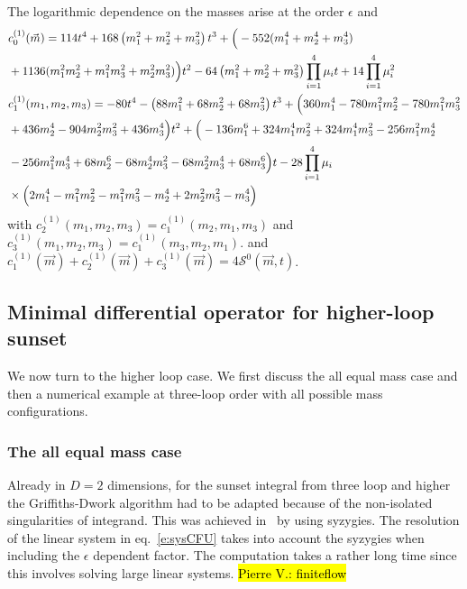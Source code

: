 \documentclass[a4paper,12pt]{article}
\numberwithin{equation}{section}
\numberwithin{figure}{section}
\newcommand{\pvnote}[1]{\sethlcolor{bubblegum} \protect\hl{Pierre V.: #1} \sethlcolor{yellow}}
\begin{document}
The logarithmic dependence on the masses arise at the order $\epsilon$ 
 and
 \begin{align}
&     c^{(1)}_0(\vec m)=114 t^{4}+168\left(m_{1}^{2}+ m_{2}^{2}+ m_{3}^{2}\right)
  t^{3}+\Big(-552 (m_{1}^{4}+m_2^4+m_3^4)\cr&+1136 (m_{1}^{2} m_{2}^{2}+
    m_{1}^{2} m_{3}^{2}+ m_{2}^{2} m_{3}^{2})\Big) t^{2}-64
  \left(m_{1}^{2}+m_{2}^{2}+m_{3}^{2}\right) \prod_{i=1}^4\mu_i t +14 \prod_{i=1}^4\mu_i^2\\
& c^{(1)}_1(m_1,m_2,m_3)=-80 t^{4}-\left( 88 m_{1}^{2}+ 68 m_{2}^{2}+68 m_{3}^{2}\right)
 t^{3}+\Big(360 m_{1}^{4}-780 m_{1}^{2} m_{2}^{2}-780 m_{1}^{2}
   m_{3}^{2}\cr&+436 m_{2}^{4}-904 m_{2}^{2} m_{3}^{2}+436
   m_{3}^{4}\Big) t^{2}+\Big(-136 m_{1}^{6}+324 m_{1}^{4}
   m_{2}^{2}+324 m_{1}^{4} m_{3}^{2}-256 m_{1}^{2} m_{2}^{4}\cr&-256
   m_{1}^{2} m_{3}^{4}+68 m_{2}^{6}-68 m_{2}^{4} m_{3}^{2}-68
   m_{2}^{2} m_{3}^{4}+68 m_{3}^{6}\Big) t -28   \prod_{i=1}^4\mu_i\cr&\times\Big(2 m_{1}^{4}-m_{1}^{2} m_{2}^{2}-m_{1}^{2} m_{3}^{2}-m_{2}^{4}+2 m_{2}^{2} m_{3}^{2}-m_{3}^{4}\Big) 
\end{align}
with $c^{(1)}_2(m_1,m_2,m_3)=c^{(1)}_1(m_2,m_1,m_3)$ and $c^{(1)}_3(m_1,m_2,m_3)=c^{(1)}_1(m_3,m_2,m_1)$.
and $c^{(1)}_1(\vec m)+c_2^{(1)}(\vec m)+c_3^{(1)}(\vec m)=4
\mathscr{S}^0(\vec m,t)$.


\subsection{Minimal differential operator for higher-loop sunset}

We now turn to the higher loop case. We first discuss the all equal
mass case and then a numerical example at three-loop order with all
possible mass configurations.
   \subsubsection{The all equal mass case}\label{sec:highersunset1mass}
Already in $D=2$ dimensions, for the sunset integral from three loop
and higher  the Griffiths-Dwork algorithm had to be adapted because of
the non-isolated singularities of integrand. This was achieved
in~\cite{Lairez:2022zkj} by using syzygies. The resolution of the
linear system in eq.~\eqref{e:sysCFU} takes into account the syzygies
when including the $\epsilon$ dependent factor.   The computation
takes a rather long time
since this involves solving large linear systems. \pvnote{finiteflow}
\end{document}
